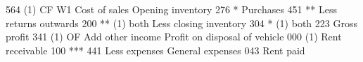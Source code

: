 \documentclass{article}
\begin{document}
     564 (1) CF W1 \newline
  \newline
    \newline
    \newline
Cost of sales \newline
    \newline
    \newline
Opening inventory  276 * \newline
    \newline
Purchases  451 ** \newline
    \newline
Less returns outwards  200 ** (1) both \newline
    \newline
Less closing inventory  304 * (1) both \newline
    \newline
 \newline
     223   \newline
Gross profit \newline
     341 (1) OF \newline
Add other income \newline
    \newline
    \newline
Profit on disposal of vehicle \newline
     000 (1) \newline
Rent receivable \newline
     100 ***  \newline
  \newline
     441   \newline
Less expenses \newline
    \newline
    \newline
General expenses  043   \newline
    \newline
Rent paid \newline
\end{document}

